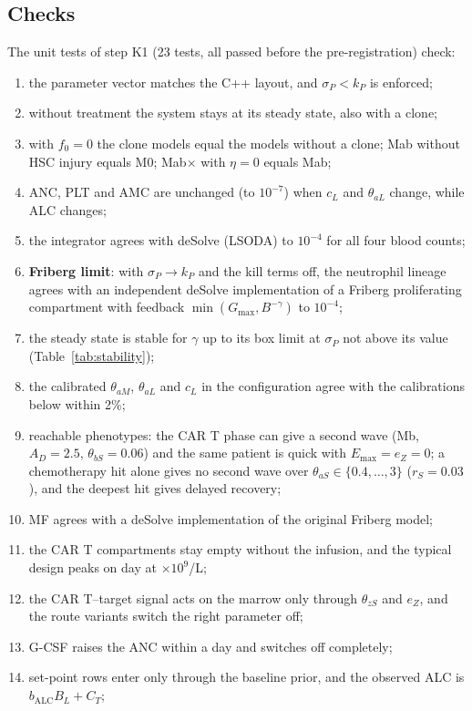 \documentclass[11pt]{article}
\begin{document}
\subsection{Checks}
The unit tests of step K1 (23 tests, all passed before the pre-registration) check:
\begin{enumerate}
\item the parameter vector matches the C++ layout, and $\sigma_P<k_P$ is enforced;
\item without treatment the system stays at its steady state, also with a clone;
\item with $f_0=0$ the clone models equal the models without a clone; Mab without HSC injury equals M0; Mab$\times$ with $\eta=0$ equals Mab;
\item ANC, PLT and AMC are unchanged (to $10^{-7}$) when $c_L$ and $\theta_{aL}$ change, while ALC changes;
\item the integrator agrees with deSolve (LSODA) to $10^{-4}$ for all four blood counts;
\item \textbf{Friberg limit}: with $\sigma_P\to k_P$ and the kill terms off, the neutrophil lineage agrees with an independent deSolve implementation of a Friberg proliferating compartment with feedback $\min(G_{\max},B^{-\gamma})$ to $10^{-4}$;
\item the steady state is stable for $\gamma$ up to its box limit at $\sigma_P$ not above its value (Table~\ref{tab:stability});
\item the calibrated $\theta_{aM}$, $\theta_{aL}$ and $c_L$ in the configuration agree with the calibrations below within 2\%;
\item reachable phenotypes: the CAR T phase can give a second wave (Mb, $A_D=2.5$, $\theta_{bS}=0.06$) and the same patient is quick with $E_{\max}=e_Z=0$; a chemotherapy hit alone gives no second wave over $\theta_{aS}\in\{0.4,\dots,3\}$ ($r_S=0.03$), and the deepest hit gives delayed recovery;
\item MF agrees with a deSolve implementation of the original Friberg model;
\item the CAR T compartments stay empty without the infusion, and the typical design peaks on day \valCartPeakDay{} at \valCartPeak{} $\times10^9$/L;
\item the CAR T--target signal acts on the marrow only through $\theta_{zS}$ and $e_Z$, and the route variants switch the right parameter off;
\item G-CSF raises the ANC within a day and switches off completely;
\item set-point rows enter only through the baseline prior, and the observed ALC is $b_{\mathrm{ALC}}B_L+C_T$;

\end{enumerate}
\end{document}
